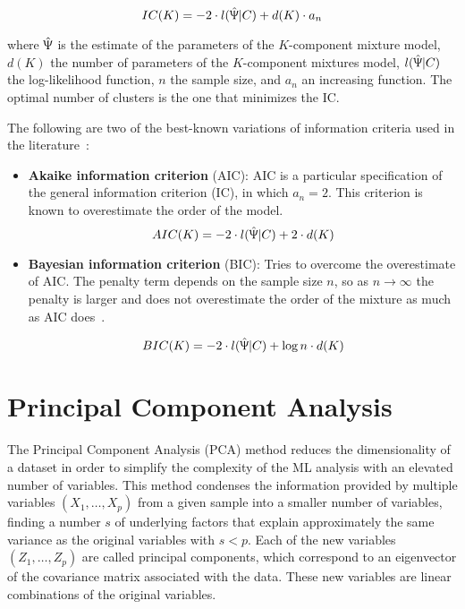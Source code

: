 \begin{equation}
    IC(K)=-2\cdot l(\hat{\Uppsi} | C)+d(K)\cdot a_n
\end{equation}

where $\hat{\Uppsi}$ is the estimate of the parameters of the $K$-component mixture model, $d(K)$ the number of parameters of the $K$-component mixtures model, $l(\hat{\Uppsi} | C)$ the log-likelihood function, $n$ the sample size, and $a_n$ an increasing function. The optimal number of clusters is the one that minimizes the IC. 

The following are two of the best-known variations of information criteria used in the literature~\cite{hu2015initializing}:

\begin{itemize}
    \item \textbf{Akaike information criterion} (AIC): AIC is a particular specification of the general information criterion (IC), in which $a_n=2$. This criterion is known to overestimate the order of the model.
    \begin{equation}
        AIC(K)=-2\cdot l(\hat{\Uppsi} | C)+2\cdot d(K)
    \end{equation}

    \item \textbf{Bayesian information criterion} (BIC): Tries to overcome the overestimate of AIC. The penalty term depends on the sample size $n$, so as $n \to \infty$ the penalty is larger and does not overestimate the order of the mixture as much as AIC does~\cite{baudry2015estimation}.

        \begin{equation}
            BIC(K)=-2\cdot l(\hat{\Uppsi} | C)+\log n \cdot d(K)
        \end{equation}
\end{itemize}


\section{Principal Component Analysis}

The Principal Component Analysis (PCA) method reduces the dimensionality of a dataset in order to simplify the complexity of the ML analysis with an elevated number of variables. This method condenses the information provided by multiple variables $(X_1,\dots,X_p)$ from a given sample into a smaller number of variables, finding a number $s$ of underlying factors that explain approximately the same variance as the original variables with $s<p$. Each of the new variables $(Z_1,\dots,Z_p)$ are called principal components, which correspond to an eigenvector of the covariance matrix associated with the data. These new variables are linear combinations of the original variables.

